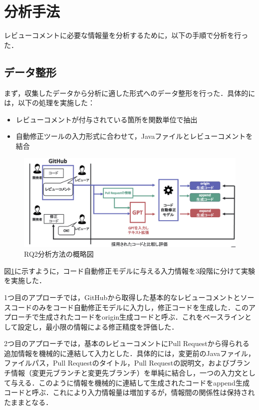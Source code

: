 \documentclass[11pt]{jreport}
\begin{document}
\section{分析手法}
レビューコメントに必要な情報量を分析するために，以下の手順で分析を行った．

\subsection{データ整形}
まず，収集したデータから分析に適した形式へのデータ整形を行った．具体的には，以下の処理を実施した：

\begin{itemize}
    \item レビューコメントが付与されている箇所を関数単位で抽出
    \item 自動修正ツールの入力形式に合わせて，Javaファイルとレビューコメントを結合
\end{itemize}
\fi

\begin{figure}[htbp]
\centering
\includegraphics[width=0.9\linewidth]{@BSthesis2024_Akamatsu/Akamatsu_figs/rq2_method_02.png}
\caption{RQ2分析方法の概略図}
\label{fig:matrix-score}
\end{figure}

図\ref{fig:matrix-score}に示すように，コード自動修正モデルに与える入力情報を3段階に分けて実験を実施した．

1つ目のアプローチでは，GitHubから取得した基本的なレビューコメントとソースコードのみをコード自動修正モデルに入力し，修正コードを生成した．このアプローチで生成されたコードをorigin生成コードと呼ぶ．これをベースラインとして設定し，最小限の情報による修正精度を評価した．

2つ目のアプローチでは，基本のレビューコメントにPull Requestから得られる追加情報を機械的に連結して入力とした．具体的には，変更前のJavaファイル，ファイルパス，Pull Requestのタイトル，Pull Requestの説明文，およびブランチ情報（変更元ブランチと変更先ブランチ）を単純に結合し，一つの入力文として与える．このように情報を機械的に連結して生成されたコードをappend生成コードと呼ぶ．これにより入力情報量は増加するが，情報間の関係性は保持されたままとなる．
\end{document}
